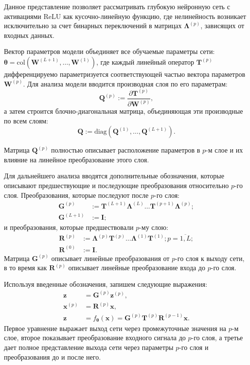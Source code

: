 Данное представление позволяет рассматривать глубокую нейронную сеть с активациями ReLU как кусочно-линейную функцию, где нелинейность возникает исключительно за счет бинарных переключений в матрицах $\boldsymbol{\Lambda}^{(p)}$, зависящих от входных данных.

Вектор параметров модели объединяет все обучаемые параметры сети: $\boldsymbol{\theta} = \mathrm{col}(\mathbf{W}^{(L+1)}, \dots, \mathbf{W}^{(1)})$, где каждый линейный оператор $\mathbf{T}^{(p)}$ дифференцируемо параметризуется соответствующей частью вектора параметров $\mathbf{W}^{(p)}$. Для анализа модели вводится производная слоя по его параметрам:
\[
    \mathbf{Q}^{(p)} := \frac{\partial \mathbf{T}^{(p)}}{\partial \mathbf{W}^{(p)}},
\]
а затем строится блочно-диагональная матрица, объединяющая эти производные по всем слоям:
\[
    \mathbf{Q}:= \mathrm{diag}({\mathbf{Q}}^{(1)}, \dots, {\mathbf{Q}}^{(L+1)}).
\]

Матрица $\mathbf{Q}^{(p)}$ полностью описывает расположение параметров в $p$-м слое и их влияние на линейное преобразование этого слоя.

Для дальнейшего анализа вводятся дополнительные обозначения, которые описывают предшествующие и последующие преобразования относительно $p$-го слоя. Преобразования, которые последуют после $p$-го слоя:
\begin{align}
    \mathbf{G}^{(p)} &:= \mathbf{T}^{(L+1)}\boldsymbol{\Lambda}^{(L)} \dots \mathbf{T}^{(p+1)}\boldsymbol{\Lambda}^{(p)}; \\
    \mathbf{G}^{(L+1)} &:= \mathbf{I};
\end{align}
и преобразования, которые предшествовали $p$-му слою:
\begin{align}
    \mathbf{R}^{(p)} &:= \boldsymbol{\Lambda}^{(p)}\mathbf{T}^{(p)} \dots \boldsymbol{\Lambda}^{(1)}\mathbf{T}^{(1)};p = \overline{1,L}; \\ 
    \mathbf{R}^{(0)} &:= \mathbf{I}.
\end{align}
Матрица $\mathbf{G}^{(p)}$ описывает линейные преобразования от $p$-го слоя к выходу сети, в то время как $\mathbf{R}^{(p)}$ описывает линейные преобразование входа до $p$-го слоя.

Используя введенные обозначения, запишем следующие выражения:
\begin{align}
    \mathbf{z} &= \mathbf{G}^{(p)}\mathbf{z}^{(p)},\\
    \mathbf{x}^{(p)} &= \mathbf{R}^{(p)}\mathbf{x}, \\
    \mathbf{z} &= f_{\boldsymbol{\theta}}(\mathbf{x}) = \mathbf{G}^{(p)}\mathbf{T}^{(p)}\mathbf{R}^{(p-1)}\mathbf{x}.
\end{align}
Первое уравнение выражает выход сети через промежуточные значения на $p$-м слое, второе показывает преобразование входного сигнала до $p$-го слоя, а третье дает полное представление выхода сети через параметры $p$-го слоя и преобразования до и после него.

